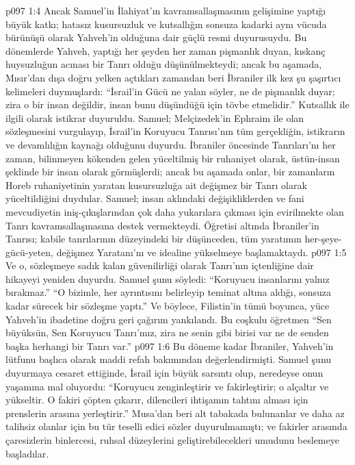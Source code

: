 \vs p097 1:4 Ancak Samuel’in İlahiyat’ın kavramsallaşmasının gelişimine yaptığı büyük katkı; hatasız kusursuzluk ve kutsallığın sonsuza kadarki aynı vücuda bürünüşü olarak Yahveh’in  olduğuna dair güçlü resmi duyurusuydu. Bu dönemlerde Yahveh, yaptığı her şeyden her zaman pişmanlık duyan, kıskanç huysuzluğun acınası bir Tanrı olduğu düşünülmekteydi; ancak bu aşamada, Mısır’dan dışa doğru yelken açtıkları zamandan beri İbraniler ilk kez şu şaşırtıcı kelimeleri duymuşlardı: “İsrail’in Gücü ne yalan söyler, ne de pişmanlık duyar; zira o bir insan değildir, insan bunu düşündüğü için tövbe etmelidir.” Kutsallık ile ilgili olarak istikrar duyuruldu. Samuel; Melçizedek’in Ephraim ile olan sözleşmesini vurgulayıp, İsrail’in Koruyucu Tanrısı’nın tüm gerçekliğin, istikrarın ve devamlılığın kaynağı olduğunu duyurdu. İbraniler öncesinde Tanrıları’nı her zaman, bilinmeyen kökenden gelen yüceltilmiş bir ruhaniyet olarak, üstün\hyp{}insan şeklinde bir insan olarak görmüşlerdi; ancak bu aşamada onlar, bir zamanların Horeb ruhaniyetinin yaratan kusursuzluğa ait değişmez bir Tanrı olarak yüceltildiğini duydular. Samuel; insan aklındaki değişikliklerden ve fani mevcudiyetin iniş\hyp{}çıkışlarından çok daha yukarılara çıkması için evirilmekte olan Tanrı kavramsallaşmasına destek vermekteydi. Öğretisi altında İbraniler’in Tanrısı; kabile tanrılarının düzeyindeki bir düşünceden, tüm yaratımın her\hyp{}şeye\hyp{}gücü\hyp{}yeten, değişmez Yaratanı’nı ve idealine yükselmeye başlamaktaydı.
\vs p097 1:5 Ve o, sözleşmeye sadık kalan güvenilirliği olarak Tanrı’nın içtenliğine dair hikayeyi yeniden duyurdu. Samuel şunu söyledi: “Koruyucu insanlarını yalnız bırakmaz.” “O bizimle, her ayrıntısını belirleyip teminat altına aldığı, sonsuza kadar sürecek bir sözleşme yaptı.” Ve böylece, Filistin’in tümü boyunca, yüce Yahveh’in ibadetine doğru geri çağırım yankılandı. Bu coşkulu öğretmen “Sen büyüksün, Sen Koruyucu Tanrı’mız, zira ne senin gibi birisi var ne de senden başka herhangi bir Tanrı var.”
\vs p097 1:6 Bu döneme kadar İbraniler, Yahveh’in lütfunu başlıca olarak maddi refah bakımından değerlendirmişti. Samuel şunu duyurmaya cesaret ettiğinde, İsrail için büyük sarsıntı olup, neredeyse onun yaşamına mal oluyordu: “Koruyucu zenginleştirir ve fakirleştirir; o alçaltır ve yükseltir. O fakiri çöpten çıkarır, dilencileri ihtişamın tahtını alması için prenslerin arasına yerleştirir.” Musa’dan beri alt tabakada bulunanlar ve daha az talihsiz olanlar için bu tür teselli edici sözler duyurulmamıştı; ve fakirler arasında çaresizlerin binlercesi, ruhsal düzeylerini geliştirebilecekleri umudunu beslemeye başladılar.
